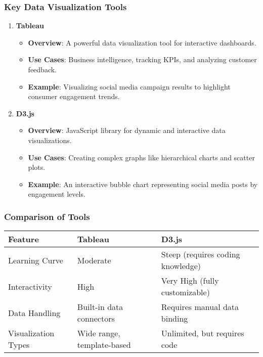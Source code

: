 \documentclass{beamer}
\begin{document}
\begin{frame}[fragile]
    \frametitle{Key Data Visualization Tools}
    \begin{enumerate}
        \item \textbf{Tableau}
            \begin{itemize}
                \item \textbf{Overview}: A powerful data visualization tool for interactive dashboards.
                \item \textbf{Use Cases}: Business intelligence, tracking KPIs, and analyzing customer feedback.
                \item \textbf{Example}: Visualizing social media campaign results to highlight consumer engagement trends.
            \end{itemize}
        \item \textbf{D3.js}
            \begin{itemize}
                \item \textbf{Overview}: JavaScript library for dynamic and interactive data visualizations.
                \item \textbf{Use Cases}: Creating complex graphs like hierarchical charts and scatter plots.
                \item \textbf{Example}: An interactive bubble chart representing social media posts by engagement levels.
            \end{itemize}
    \end{enumerate}
\end{frame}

\begin{frame}[fragile]
    \frametitle{Comparison of Tools}
    \begin{table}[]
        \centering
        \begin{tabular}{|l|l|l|}
            \hline
            \textbf{Feature} & \textbf{Tableau} & \textbf{D3.js} \\ \hline
            Learning Curve & Moderate & Steep (requires coding knowledge) \\ \hline
            Interactivity & High & Very High (fully customizable) \\ \hline
            Data Handling & Built-in data connectors & Requires manual data binding \\ \hline
            Visualization Types & Wide range, template-based & Unlimited, but requires code \\ \hline
        \end{tabular}
    \end{table}
\end{frame}
\end{document}
